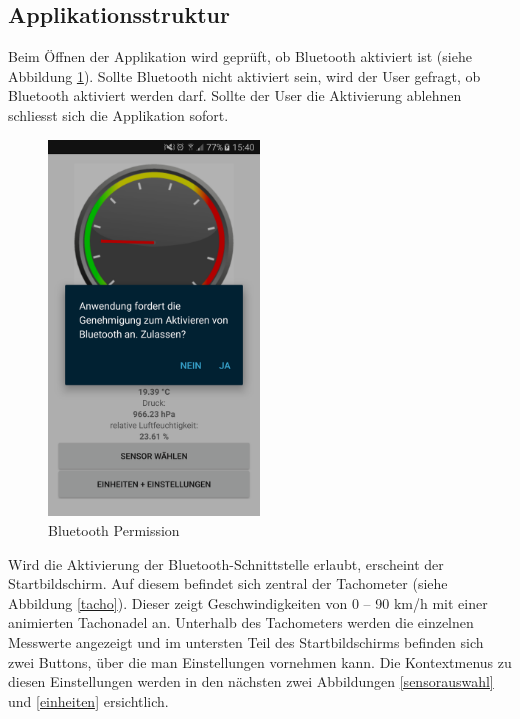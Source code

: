 \subsection{Applikationsstruktur}

Beim Öffnen der Applikation wird geprüft, ob Bluetooth aktiviert ist (siehe Abbildung \ref{permission}). Sollte Bluetooth nicht aktiviert sein, wird der User gefragt, ob Bluetooth aktiviert werden darf. Sollte der User die Aktivierung ablehnen schliesst sich die Applikation sofort.

\begin{figure}[ht]
    \includegraphics[width=0.5\textwidth]{4Resultate/imag/BLEBluetoothPermission.png} 
    \caption{Bluetooth Permission}
    \label{permission}
\end{figure}

Wird die Aktivierung der Bluetooth-Schnittstelle erlaubt, erscheint der Startbildschirm. Auf diesem befindet sich zentral der Tachometer (siehe Abbildung \ref{tacho}). Dieser zeigt Geschwindigkeiten von 0 – 90 km/h mit einer animierten Tachonadel an. Unterhalb des Tachometers werden die einzelnen Messwerte angezeigt und im untersten Teil des Startbildschirms befinden sich zwei Buttons, über die man Einstellungen vornehmen kann. Die Kontextmenus zu diesen Einstellungen werden in den nächsten zwei Abbildungen \ref{sensorauswahl} und \ref{einheiten} ersichtlich. 

